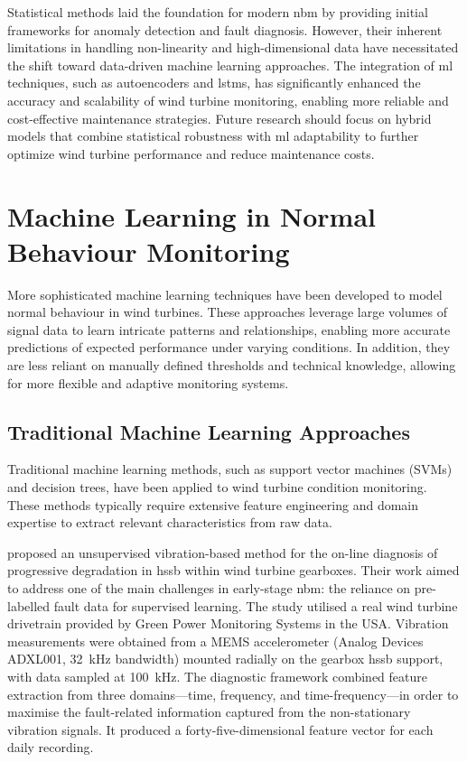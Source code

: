 Statistical methods laid the foundation for modern \gls{nbm} by providing initial frameworks for anomaly detection and fault diagnosis.
However, their inherent limitations in handling non-linearity and high-dimensional data have necessitated the shift toward data-driven machine learning approaches.
The integration of \gls{ml} techniques, such as autoencoders and \glspl{lstm}, has significantly enhanced the accuracy and scalability of wind turbine monitoring, enabling more reliable and cost-effective maintenance strategies.
Future research should focus on hybrid models that combine statistical robustness with \gls{ml} adaptability to further optimize wind turbine performance and reduce maintenance costs.


\section{Machine Learning in Normal Behaviour Monitoring}
\label{sec:machine-learning-in-normal-behaviour-monitoring}
More sophisticated machine learning techniques have been developed to model normal behaviour in wind turbines. 
These approaches leverage large volumes of signal data to learn intricate patterns and relationships, enabling more accurate predictions of expected performance under varying conditions.
In addition, they are less reliant on manually defined thresholds and technical knowledge, allowing for more flexible and adaptive monitoring systems.

\subsection{Traditional Machine Learning Approaches}
\label{subsec:traditional-machine-learning-approaches}
Traditional machine learning methods, such as support vector machines (SVMs) and decision trees, have been applied to wind turbine condition monitoring.
These methods typically require extensive feature engineering and domain expertise to extract relevant characteristics from raw data.

\cite{ben_ali_online_2018} proposed an unsupervised vibration-based method for the on-line diagnosis of progressive degradation in \gls{hssb} within wind turbine gearboxes.
Their work aimed to address one of the main challenges in early-stage \gls{nbm}: the reliance on pre-labelled fault data for supervised learning.
The study utilised a real wind turbine drivetrain provided by Green Power Monitoring Systems in the USA.
Vibration measurements were obtained from a MEMS accelerometer (Analog Devices ADXL001, \SI{32}{\kilo\hertz} bandwidth) mounted radially on the gearbox \gls{hssb} support, with data sampled at \SI{100}{\kilo\hertz}.
The diagnostic framework combined feature extraction from three domains—time, frequency, and time-frequency—in order to maximise the fault-related information captured from the non-stationary vibration signals.
It produced a forty-five-dimensional feature vector for each daily recording.


